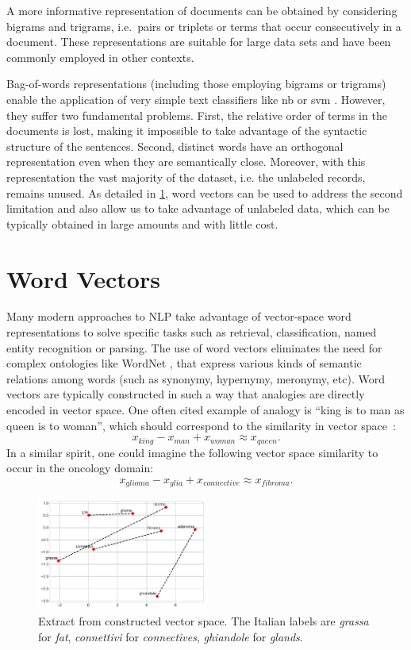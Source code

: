A more informative representation of documents can be obtained by
considering bigrams and trigrams, i.e.\ pairs or triplets or
terms that occur consecutively in a document. These representations
are suitable for large data sets and have been commonly employed in
other contexts.

Bag-of-words representations (including those employing bigrams or
trigrams) enable the application of very simple text classifiers like
\ac{nb} or \ac{svm} \cite{cortes-support-1995}. However, they 
suffer two fundamental problems. First, the relative order of terms in
the documents is lost, making it impossible to take advantage of the
syntactic structure of the sentences. Second, distinct words have an
orthogonal representation even when they are semantically
close. Moreover, with this representation  the vast majority of the dataset, i.e. the unlabeled
records, remains unused. As detailed in \cref{sec:word-vectors}, word
vectors can be used to address the second limitation and also allow us
to take advantage of unlabeled data, which can be typically
obtained in large amounts and with little cost.

\section{Word Vectors}
\label{sec:word-vectors}
Many modern approaches to NLP take advantage of vector-space word
representations to solve specific tasks such as retrieval,
classification, named entity recognition or parsing. %
The use of word vectors eliminates the need for complex ontologies
like WordNet \cite{fellbaum-wordnet-1998}, that express various kinds of semantic relations among
words (such as synonymy, hypernymy, meronymy, etc). Word vectors are
typically constructed in such a way that analogies are directly
encoded in vector space. One often cited example of analogy is ``king
is to man as queen is to woman'', which should correspond to the
similarity in vector space~\cite{mikolov_linguistic_2013}:
$$
x_\mathit{king}-x_\mathit{man}+x_\mathit{woman} \approx x_\mathit{queen}.
$$
In a similar spirit, one could imagine the following vector space
similarity to occur in the oncology domain:
$$
x_\mathit{glioma}-x_\mathit{glia}+x_\mathit{connective} \approx
x_\mathit{fibroma}.
$$
\begin{figure}
  \centering
  \includegraphics[width=0.5\textwidth]{img/gloveGraph.pdf}
  \caption{Extract from constructed vector space. The Italian labels
    are \emph{grassa} for \emph{fat}, \emph{connettivi} for
    \emph{connectives}, \emph{ghiandole} for \emph{glands}.}
  \label{fig:gloveGraph}
\end{figure}

